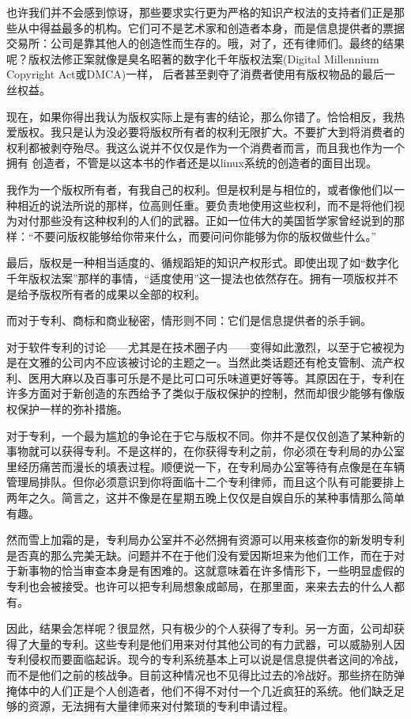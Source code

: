 也许我们并不会感到惊讶，那些要求实行更为严格的知识产权法的支持者们正是那些从中得益最多的机构。它们可不是艺术家和创造者本身，而是信息提供者的票据交易所：公司是靠其他人的创造性而生存的。哦，对了，还有律师们。最终的结果呢？版权法修正案就像是臭名昭著的数字化千年版权法案(Digital Millennium Copyright Act或DMCA)一样， 后者甚至剥夺了消费者使用有版权物品的最后一丝权益。

现在，如果你得出我认为版权实际上是有害的结论，那么你错了。恰恰相反，我热爱版权。我只是认为没必要将版权所有者的权利无限扩大。不要扩大到将消费者的权利都被剥夺殆尽。我这么说并不仅仅是作为一个消费者而言，而且我也作为一个拥有 创造者，不管是以这本书的作者还是以linux系统的创造者的面目出现。

我作为一个版权所有者，有我自己的权利。但是权利是与相位的，或者像他们以一种相近的说法所说的那样，位高则任重。要负责地使用这些权利，而不是将他们视为对付那些没有这种权利的人们的武器。正如一位伟大的美国哲学家曾经说到的那样：“不要问版权能够给你带来什么，而要问问你能够为你的版权做些什么。”

最后，版权是一种相当适度的、循规蹈矩的知识产权形式。即使出现了如“数字化千年版权法案”那样的事情，“适度使用”这一提法也依然存在。拥有一项版权并不是给予版权所有者的成果以全部的权利。

而对于专利、商标和商业秘密，情形则不同：它们是信息提供者的杀手锏。

对于软件专利的讨论——尤其是在技术圈子内——变得如此激烈，以至于它被视为是在文雅的公司内不应该被讨论的主题之一。当然此类话题还有枪支管制、流产权利、医用大麻以及百事可乐是不是比可口可乐味道更好等等。其原因在于，专利在许多方面对于新创造的东西给予了类似于版权保护的控制，然而却很少能够有像版权保护一样的弥补措施。

对于专利，一个最为尴尬的争论在于它与版权不同。你并不是仅仅创造了某种新的事物就可以获得专利。不是这样的，在你获得专利之前，你必须在专利局的办公室里经历痛苦而漫长的填表过程。顺便说一下，在专利局办公室等待有点像是在车辆管理局排队。但你必须意识到你将面临十二个专利律师，而且这个队有可能要排上两年之久。简言之，这并不像是在星期五晚上仅仅是自娱自乐的某种事情那么简单有趣。

然而雪上加霜的是，专利局办公室并不必然拥有资源可以用来核查你的新发明专利是否真的那么完美无缺。问题并不在于他们没有爱因斯坦来为他们工作，而在于对于新事物的恰当审查本身是有困难的。这就意味着在许多情形下，一些明显虚假的专利也会被接受。也许可以把专利局想象成邮局，在那里面，来来去去的什么人都有。

因此，结果会怎样呢？很显然，只有极少的个人获得了专利。另一方面，公司却获得了大量的专利。这些专利是他们用来对付其他公司的有力武器，可以威胁别人因专利侵权而要面临起诉。现今的专利系统基本上可以说是信息提供者这间的冷战，而不是他们之前的核战争。目前这种情况也不见得比过去的冷战好。那些挤在防弹掩体中的人们正是个人创造者，他们不得不对付一个几近疯狂的系统。他们缺乏足够的资源，无法拥有大量律师来对付繁琐的专利申请过程。

